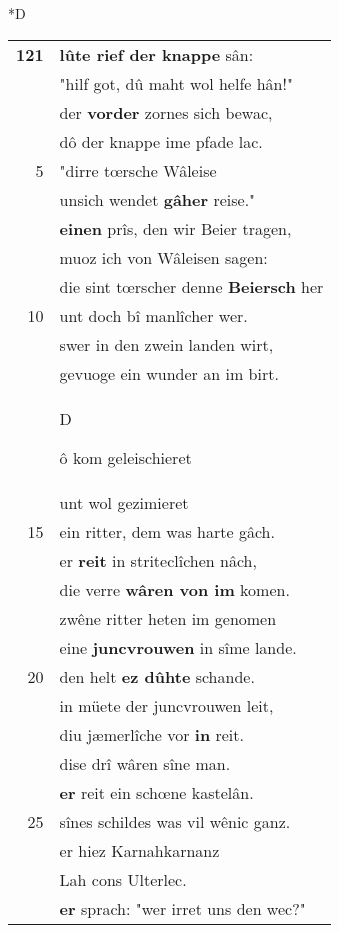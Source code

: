 \documentclass[8pt,a4paper,notitlepage]{article}
\begin{document}
\begin{table}[ht]
\begin{minipage}[t]{0.5\linewidth}
\small
\begin{center}*D
\end{center}
\begin{tabular}{rl}
\textbf{121} & \textbf{lûte rief der knappe} sân:\\ 
 & "hilf got, dû maht wol helfe hân!"\\ 
 & der \textbf{vorder} zornes sich bewac,\\ 
 & dô der knappe ime pfade lac.\\ 
5 & "dirre tœrsche Wâleise\\ 
 & unsich wendet \textbf{gâher} reise."\\ 
 & \textbf{einen} prîs, den wir Beier tragen,\\ 
 & muoz ich von Wâleisen sagen:\\ 
 & die sint tœrscher denne \textbf{Beiersch} her\\ 
10 & unt doch bî manlîcher wer.\\ 
 & swer in den zwein landen wirt,\\ 
 & gevuoge ein wunder an im birt.\\ 
 & \begin{large}D\end{large}ô kom geleischieret\\ 
 & unt wol gezimieret\\ 
15 & ein ritter, dem was harte gâch.\\ 
 & er \textbf{reit} in striteclîchen nâch,\\ 
 & die verre \textbf{wâren von im} komen.\\ 
 & zwêne ritter heten im genomen\\ 
 & eine \textbf{juncvrouwen} in sîme lande.\\ 
20 & den helt \textbf{ez dûhte} schande.\\ 
 & in müete der juncvrouwen leit,\\ 
 & diu jæmerlîche vor \textbf{in} reit.\\ 
 & dise drî wâren sîne man.\\ 
 & \textbf{er} reit ein schœne kastelân.\\ 
25 & sînes schildes was vil wênic ganz.\\ 
 & er hiez Karnahkarnanz\\ 
 & Lah cons Ulterlec.\\ 
 & \textbf{er} sprach: "wer irret uns den wec?"\\ 

\end{tabular}
\end{minipage}
\end{table}
\end{document}
